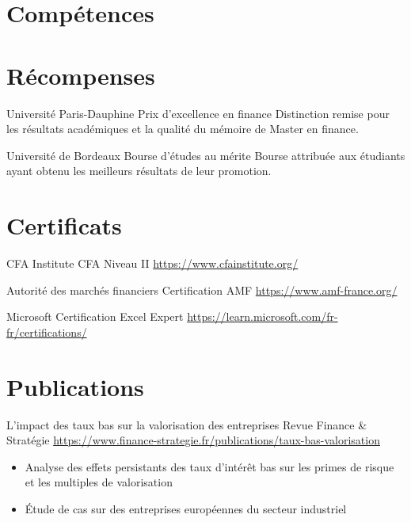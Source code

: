 \documentclass[a4paper, serif, 10pt]{moderncv}
\begin{document}
\section{Compétences}

\section{Récompenses}

        {Université Paris-Dauphine}
        {Prix d'excellence en finance}
        {}
        {}
        {Distinction remise pour les résultats académiques et la qualité du mémoire de Master en finance.}

        {Université de Bordeaux}
        {Bourse d'études au mérite}
        {}
        {}
        {Bourse attribuée aux étudiants ayant obtenu les meilleurs résultats de leur promotion.}
\section{Certificats}

        {CFA Institute}
        {CFA Niveau II}
        {\url{https://www.cfainstitute.org/}}
        {}
        {}

        {Autorité des marchés financiers}
        {Certification AMF}
        {\url{https://www.amf-france.org/}}
        {}
        {}

        {Microsoft}
        {Certification Excel Expert}
        {\url{https://learn.microsoft.com/fr-fr/certifications/}}
        {}
        {}
\section{Publications}

        {L'impact des taux bas sur la valorisation des entreprises}
        {Revue Finance \& Stratégie}
        {\url{https://www.finance-strategie.fr/publications/taux-bas-valorisation}}
        {}
        {\begin{itemize}
\item Analyse des effets persistants des taux d'intérêt bas sur les primes de risque et les multiples de valorisation
\item Étude de cas sur des entreprises européennes du secteur industriel
\end{itemize}}
\end{document}
